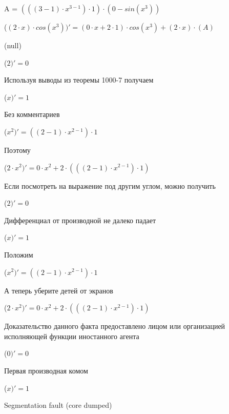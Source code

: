\documentclass[12pt,a4paper,fleqn]{article}
\begin{document}
\begin{center}
A = $(((3-1) \cdot x^{3-1}) \cdot 1) \cdot (0-sin(x^{3}))$\end{center}
\begin{center}
 ($(2 \cdot x) \cdot cos(x^{3}))'
  = (0 \cdot x+2 \cdot 1) \cdot cos(x^{3})+(2 \cdot x) \cdot (A)$\end{center}
(null)\cite{link4}

\begin{center}
 ($2)'
  = 0$\end{center}
Используя выводы из теоремы 1000-7 получаем

\begin{center}
 ($x)'
  = 1$\end{center}
Без комментариев\cite{link4}

\begin{center}
 ($x^{2})'
  = ((2-1) \cdot x^{2-1}) \cdot 1$\end{center}
Поэтому

\begin{center}
 ($2 \cdot x^{2})'
  = 0 \cdot x^{2}+2 \cdot (((2-1) \cdot x^{2-1}) \cdot 1)$\end{center}
Если посмотреть на выражение под другим углом, можно получить

\begin{center}
 ($2)'
  = 0$\end{center}
Дифференциал от производной не далеко падает\cite{link2}

\begin{center}
 ($x)'
  = 1$\end{center}
Положим

\begin{center}
 ($x^{2})'
  = ((2-1) \cdot x^{2-1}) \cdot 1$\end{center}
А теперь уберите детей от экранов

\begin{center}
 ($2 \cdot x^{2})'
  = 0 \cdot x^{2}+2 \cdot (((2-1) \cdot x^{2-1}) \cdot 1)$\end{center}
Доказательство данного факта предоставлено лицом или организацией исполняющей функции иностанного агента

\begin{center}
 ($0)'
  = 0$\end{center}
Первая производная комом\cite{link2}

\begin{center}
 ($x)'
  = 1$\end{center}
Segmentation fault (core dumped)
\end{document}
